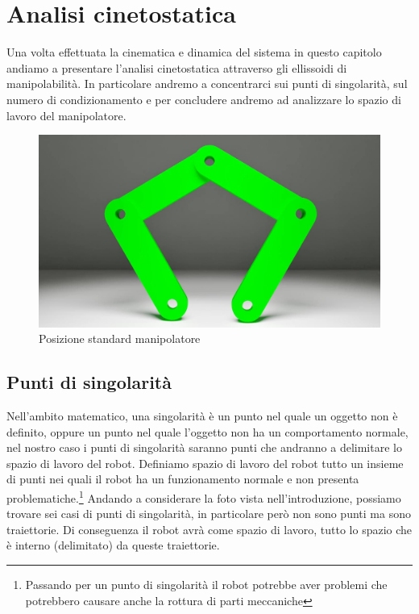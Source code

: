 \section{Analisi cinetostatica}
Una volta effettuata la cinematica e dinamica del sistema in questo capitolo andiamo a presentare l'analisi cinetostatica attraverso gli ellissoidi di manipolabilità. In particolare andremo a concentrarci sui punti di singolarità, sul numero di condizionamento e per concludere andremo ad analizzare lo spazio di lavoro del manipolatore.
\begin{figure}[ht]
	\begin{center}
		\includegraphics[scale=0.4]{Immagini/Singolarity/0}
		\caption{Posizione standard manipolatore}
	\end{center}
\end{figure}
\subsection{Punti di singolarità}
Nell'ambito matematico, una singolarità è un punto nel quale un oggetto non è definito, oppure un punto nel quale l'oggetto non ha un comportamento normale, nel nostro caso i punti di singolarità saranno punti che andranno a delimitare lo spazio di lavoro del robot. Definiamo spazio di lavoro del robot tutto un insieme di punti nei quali il robot ha un funzionamento normale e non presenta problematiche.\footnote{Passando per un punto di singolarità il robot potrebbe aver problemi che potrebbero causare anche la rottura di parti meccaniche} Andando a considerare la foto vista nell'introduzione, possiamo trovare sei casi di punti di singolarità, in particolare però non sono punti ma sono traiettorie. Di conseguenza il robot avrà come spazio di lavoro, tutto lo spazio che è interno (delimitato) da queste traiettorie.
